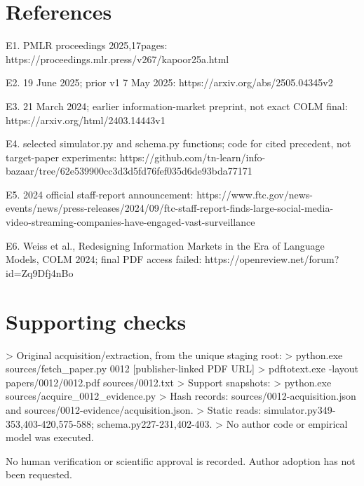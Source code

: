 \documentclass[10pt]{article}
\begin{document}
\section*{References}
E1. PMLR proceedings 2025,17pages: https://proceedings.mlr.press/v267/kapoor25a.html\par
E2. 19 June 2025; prior v1 7 May 2025: https://arxiv.org/abs/2505.04345v2\par
E3. 21 March 2024; earlier information-market preprint, not exact COLM final: https://arxiv.org/html/2403.14443v1\par
E4. selected simulator.py and schema.py functions; code for cited precedent, not target-paper experiments: https://github.com/tn-learn/info-bazaar/tree/62e539900cc3d3d5fd76fef035d6de93bda77171\par
E5. 2024 official staff-report announcement: https://www.ftc.gov/news-events/news/press-releases/2024/09/ftc-staff-report-finds-large-social-media-video-streaming-companies-have-engaged-vast-surveillance\par
E6. Weiss et al., Redesigning Information Markets in the Era of Language Models, COLM 2024; final PDF access failed: https://openreview.net/forum?id=Zq9Dfj4nBo\par
\section*{Supporting checks}
> Original acquisition/extraction, from the unique staging root:
> python.exe sources/fetch\_paper.py 0012 [publisher-linked PDF URL]
> pdftotext.exe -layout papers/0012/0012.pdf sources/0012.txt
> Support snapshots:
> python.exe sources/acquire\_0012\_evidence.py
> Hash records: sources/0012-acquisition.json and sources/0012-evidence/acquisition.json.
> Static reads: simulator.py349-353,403-420,575-588; schema.py227-231,402-403.
> No author code or empirical model was executed.\par
No human verification or scientific approval is recorded. Author adoption has not been requested.\par
\end{document}
